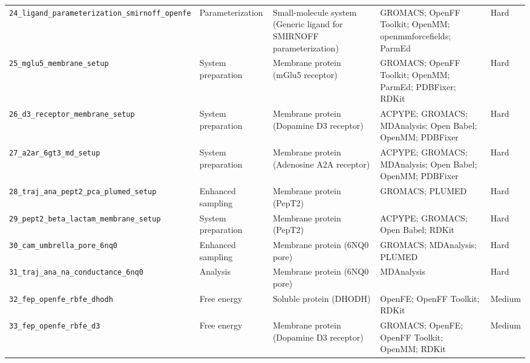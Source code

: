 \documentclass[11pt,a4paper]{article}
\begin{document}
\begin{longtable}{@{}L{0.19\textwidth}L{0.15\textwidth}L{0.29\textwidth}L{0.24\textwidth}L{0.09\textwidth}@{}}
\texttt{24\_\allowbreak{}ligand\_\allowbreak{}parameterization\_\allowbreak{}smirnoff\_\allowbreak{}openfe} & Parameterization & Small-molecule system (Generic ligand for SMIRNOFF parameterization) & GROMACS; \allowbreak{}OpenFF Toolkit; \allowbreak{}OpenMM; \allowbreak{}openmmforcefields; \allowbreak{}ParmEd & Hard \\
\texttt{25\_\allowbreak{}mglu5\_\allowbreak{}membrane\_\allowbreak{}setup} & System preparation & Membrane protein (mGlu5 receptor) & GROMACS; \allowbreak{}OpenFF Toolkit; \allowbreak{}OpenMM; \allowbreak{}ParmEd; \allowbreak{}PDBFixer; \allowbreak{}RDKit & Hard \\
\texttt{26\_\allowbreak{}d3\_\allowbreak{}receptor\_\allowbreak{}membrane\_\allowbreak{}setup} & System preparation & Membrane protein (Dopamine D3 receptor) & ACPYPE; \allowbreak{}GROMACS; \allowbreak{}MDAnalysis; \allowbreak{}Open Babel; \allowbreak{}OpenMM; \allowbreak{}PDBFixer & Hard \\
\texttt{27\_\allowbreak{}a2ar\_\allowbreak{}6gt3\_\allowbreak{}md\_\allowbreak{}setup} & System preparation & Membrane protein (Adenosine A2A receptor) & ACPYPE; \allowbreak{}GROMACS; \allowbreak{}MDAnalysis; \allowbreak{}Open Babel; \allowbreak{}OpenMM; \allowbreak{}PDBFixer & Hard \\
\texttt{28\_\allowbreak{}traj\_\allowbreak{}ana\_\allowbreak{}pept2\_\allowbreak{}pca\_\allowbreak{}plumed\_\allowbreak{}setup} & Enhanced sampling & Membrane protein (PepT2) & GROMACS; \allowbreak{}PLUMED & Hard \\
\texttt{29\_\allowbreak{}pept2\_\allowbreak{}beta\_\allowbreak{}lactam\_\allowbreak{}membrane\_\allowbreak{}setup} & System preparation & Membrane protein (PepT2) & ACPYPE; \allowbreak{}GROMACS; \allowbreak{}Open Babel; \allowbreak{}RDKit & Hard \\
\texttt{30\_\allowbreak{}cam\_\allowbreak{}umbrella\_\allowbreak{}pore\_\allowbreak{}6nq0} & Enhanced sampling & Membrane protein (6NQ0 pore) & GROMACS; \allowbreak{}MDAnalysis; \allowbreak{}PLUMED & Hard \\
\texttt{31\_\allowbreak{}traj\_\allowbreak{}ana\_\allowbreak{}na\_\allowbreak{}conductance\_\allowbreak{}6nq0} & Analysis & Membrane protein (6NQ0 pore) & MDAnalysis & Hard \\
\texttt{32\_\allowbreak{}fep\_\allowbreak{}openfe\_\allowbreak{}rbfe\_\allowbreak{}dhodh} & Free energy & Soluble protein (DHODH) & OpenFE; \allowbreak{}OpenFF Toolkit; \allowbreak{}RDKit & Medium \\
\texttt{33\_\allowbreak{}fep\_\allowbreak{}openfe\_\allowbreak{}rbfe\_\allowbreak{}d3} & Free energy & Membrane protein (Dopamine D3 receptor) & GROMACS; \allowbreak{}OpenFE; \allowbreak{}OpenFF Toolkit; \allowbreak{}OpenMM; \allowbreak{}RDKit & Medium \\

\end{longtable}
\end{document}
